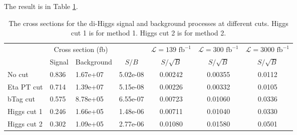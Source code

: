 \documentclass[12pt]{article}
\begin{document}
		The result is in Table \ref{tab:diHiggs_signal_background_analysis}.
		\begin{table}[htpb]
			\centering
			\caption{The cross sections for the di-Higgs signal and background processes at different cuts. Higgs cut 1 is for method 1. Higgs cut 2 is for method 2.}
			\label{tab:diHiggs_signal_background_analysis}
			\begin{tabular}{l|ll|c|c|c|c}
						   & \multicolumn{2}{c|}{Cross section (fb)} &          & $\mathcal{L} = 139 \text{ fb}^{-1}$ & $\mathcal{L} = 300 \text{ fb}^{-1}$ & $\mathcal{L} = 3000 \text{ fb}^{-1}$ \\
						   & Signal           & Background           & $S / B$  & $S/\sqrt{B}$& $S/\sqrt{B}$& $S/\sqrt{B}$\\ \hline
				No cut     & 0.836            & 1.67e+07             & 5.02e-08 & 0.00242     & 0.00355     & 0.0112      \\
				Eta PT cut & 0.714            & 1.39e+07             & 5.15e-08 & 0.00226     & 0.00332     & 0.0105      \\
				bTag cut   & 0.575            & 8.78e+05             & 6.55e-07 & 0.00723     & 0.01060     & 0.0336      \\
				Higgs cut 1& 0.246            & 1.66e+05             & 1.48e-06 & 0.00711     & 0.01040     & 0.0330      \\
				Higgs cut 2& 0.302            & 1.09e+05             & 2.77e-06 & 0.01080     & 0.01580     & 0.0501     			
			\end{tabular}		
		\end{table}
\end{document}
